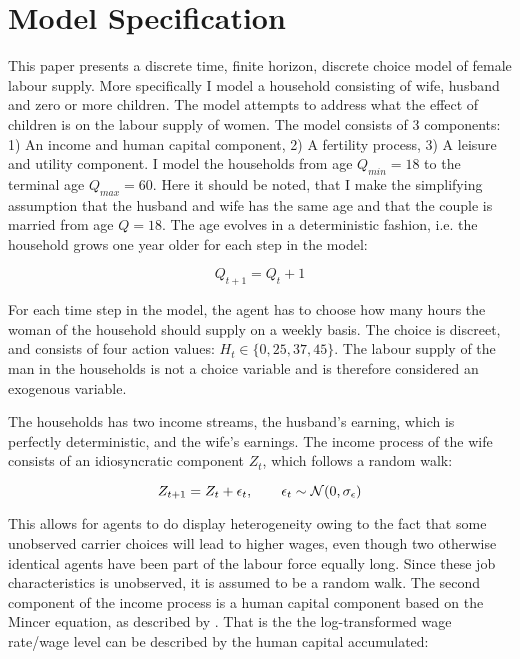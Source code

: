 \section{Model Specification}\label{sec:model1}

This paper presents a discrete time, finite horizon, discrete choice model of female labour supply. More specifically I model a household consisting of wife, husband and zero or more children. The model attempts to address what the effect of children is on the labour supply of women. The model consists of 3 components: 1) An income and human capital component, 2) A fertility process, 3) A leisure and utility component. I model the households from age $Q_{min}=18$ to the terminal age $Q_{max} = 60$. Here it should be noted, that I make the simplifying assumption that the husband and wife has the same age and that the couple is married from age $Q=18$. The age evolves in a deterministic fashion, i.e. the household grows one year older for each step in the model:

\begin{equation}
    Q_{t+1} = Q_t + 1
\end{equation}

For each time step in the model, the agent has to  choose how many hours the woman of the household should supply on a weekly basis. The choice is discreet, and consists of four action values: $H_t \in \{0, 25, 37, 45 \}$. The labour supply of the man in the households is not a choice variable and is therefore considered an exogenous variable.

The households has two income streams, the husband's earning, which is perfectly deterministic, and the wife's earnings. The income process of the wife consists of an idiosyncratic component $Z_t$, which follows a random walk:

\begin{equation}
    Z_{t+1} = Z_t + \epsilon_t, \qquad \epsilon_t \sim \mathcal{N} (0, \sigma_\epsilon)
\end{equation}

This allows for agents to do display heterogeneity owing to the fact that some unobserved carrier choices will lead to higher wages, even though two otherwise identical agents have been part of the labour force equally long. Since these job characteristics is unobserved, it is assumed to be a random walk. The second component of the income process is a human capital component based on the Mincer equation, as described by \textcite{lemieux_mincer_2006}. That is the the log-transformed wage rate/wage level can be described by the human capital accumulated:

